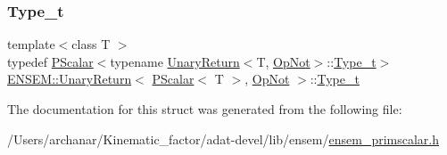 \mbox{\label{structENSEM_1_1UnaryReturn_3_01PScalar_3_01T_01_4_00_01OpNot_01_4_a7612702a79b74f223457b785dbd77b2b}} 
\subsubsection{\texorpdfstring{Type\_t}{Type\_t}\hspace{0.1cm}{\footnotesize\ttfamily [3/3]}}
{\footnotesize\ttfamily template$<$class T $>$ \\
typedef \mbox{\hyperlink{classENSEM_1_1PScalar}{P\+Scalar}}$<$typename \mbox{\hyperlink{structENSEM_1_1UnaryReturn}{Unary\+Return}}$<$T, \mbox{\hyperlink{structENSEM_1_1OpNot}{Op\+Not}}$>$\+::\mbox{\hyperlink{structENSEM_1_1UnaryReturn_3_01PScalar_3_01T_01_4_00_01OpNot_01_4_a7612702a79b74f223457b785dbd77b2b}{Type\+\_\+t}}$>$ \mbox{\hyperlink{structENSEM_1_1UnaryReturn}{E\+N\+S\+E\+M\+::\+Unary\+Return}}$<$ \mbox{\hyperlink{classENSEM_1_1PScalar}{P\+Scalar}}$<$ T $>$, \mbox{\hyperlink{structENSEM_1_1OpNot}{Op\+Not}} $>$\+::\mbox{\hyperlink{structENSEM_1_1UnaryReturn_3_01PScalar_3_01T_01_4_00_01OpNot_01_4_a7612702a79b74f223457b785dbd77b2b}{Type\+\_\+t}}}



The documentation for this struct was generated from the following file\+:\begin{DoxyCompactItemize}
\item 
/\+Users/archanar/\+Kinematic\+\_\+factor/adat-\/devel/lib/ensem/\mbox{\hyperlink{adat-devel_2lib_2ensem_2ensem__primscalar_8h}{ensem\+\_\+primscalar.\+h}}\end{DoxyCompactItemize}
